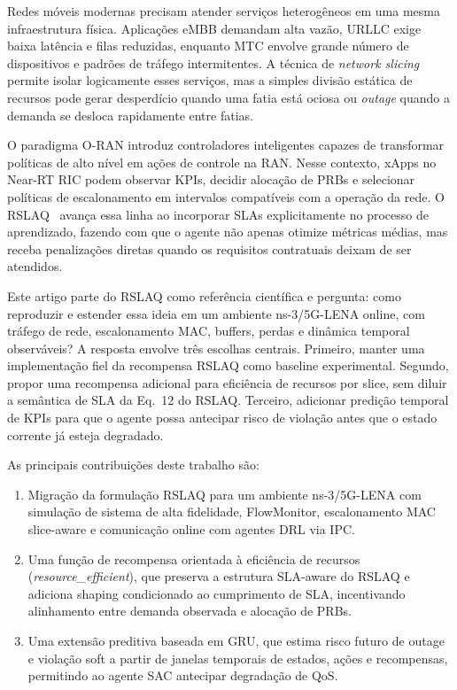 \documentclass[10pt,a4paper]{IEEEtran}
\begin{document}
Redes m\'{o}veis modernas precisam atender servi\c{c}os
heterog\^{e}neos em uma mesma infraestrutura f\'{i}sica.
Aplica\c{c}\~{o}es eMBB demandam alta vaz\~{a}o, URLLC exige
baixa lat\^{e}ncia e filas reduzidas, enquanto MTC envolve
grande n\'{u}mero de dispositivos e padr\~{o}es de tr\'{a}fego
intermitentes. A t\'{e}cnica de \emph{network slicing} permite
isolar logicamente esses servi\c{c}os, mas a simples
divis\~{a}o est\'{a}tica de recursos pode gerar desperd\'{i}cio
quando uma fatia est\'{a} ociosa ou \emph{outage} quando a
demanda se desloca rapidamente entre fatias.

O paradigma O-RAN introduz controladores inteligentes capazes
de transformar pol\'{i}ticas de alto n\'{i}vel em a\c{c}\~{o}es
de controle na RAN. Nesse contexto, xApps no Near-RT RIC podem
observar KPIs, decidir aloca\c{c}\~{a}o de PRBs e selecionar
pol\'{i}ticas de escalonamento em intervalos compat\'{i}veis com
a opera\c{c}\~{a}o da rede. O RSLAQ~\cite{yungaicela2026rslaq}
avan\c{c}a essa linha ao incorporar SLAs explicitamente no
processo de aprendizado, fazendo com que o agente n\~{a}o apenas
otimize m\'{e}tricas m\'{e}dias, mas receba penaliza\c{c}\~{o}es
diretas quando os requisitos contratuais deixam de ser atendidos.

Este artigo parte do RSLAQ como refer\^{e}ncia cient\'{i}fica e
pergunta: como reproduzir e estender essa ideia em um ambiente
ns-3/5G-LENA online, com tr\'{a}fego de rede, escalonamento
MAC, buffers, perdas e din\^{a}mica temporal observ\'{a}veis? A
resposta envolve tr\^{e}s escolhas centrais. Primeiro, manter
uma implementa\c{c}\~{a}o fiel da recompensa RSLAQ como
baseline experimental. Segundo, propor uma recompensa adicional
para efici\^{e}ncia de recursos por slice, sem diluir a
sem\^{a}ntica de SLA da Eq.~12 do RSLAQ. Terceiro, adicionar
predi\c{c}\~{a}o temporal de KPIs para que o agente possa
antecipar risco de viola\c{c}\~{a}o antes que o estado corrente
j\'{a} esteja degradado.

As principais contribui\c{c}\~{o}es deste trabalho s\~{a}o:

\begin{enumerate}
\item Migra\c{c}\~{a}o da formula\c{c}\~{a}o RSLAQ para um
  ambiente ns-3/5G-LENA com simula\c{c}\~{a}o de sistema de alta
  fidelidade, FlowMonitor, escalonamento MAC slice-aware e
  comunica\c{c}\~{a}o online com agentes DRL via IPC.

\item Uma fun\c{c}\~{a}o de recompensa orientada \`{a}
  efici\^{e}ncia de recursos (\emph{resource\_efficient}), que
  preserva a estrutura SLA-aware do RSLAQ e adiciona shaping
  condicionado ao cumprimento de SLA, incentivando alinhamento
  entre demanda observada e aloca\c{c}\~{a}o de PRBs.

\item Uma extens\~{a}o preditiva baseada em GRU, que estima
  risco futuro de outage e viola\c{c}\~{a}o soft a partir de
  janelas temporais de estados, a\c{c}\~{o}es e recompensas,
  permitindo ao agente SAC antecipar degrada\c{c}\~{a}o de QoS.
\end{enumerate}
\end{document}
